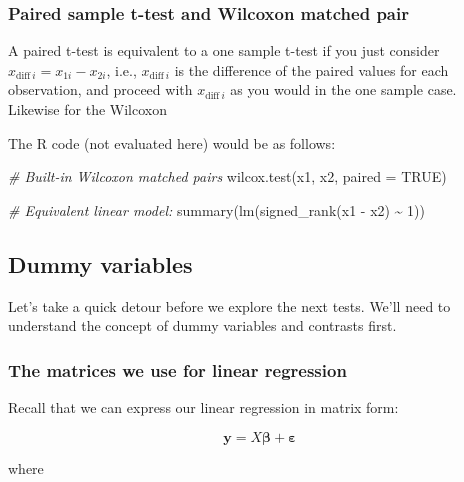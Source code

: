 \documentclass[
  openany]{book}
\newenvironment{Shaded}{\begin{snugshade}}{\end{snugshade}}
\newcommand{\AttributeTok}[1]{\textcolor[rgb]{0.77,0.63,0.00}{#1}}
\newcommand{\CommentTok}[1]{\textcolor[rgb]{0.56,0.35,0.01}{\textit{#1}}}
\newcommand{\ConstantTok}[1]{\textcolor[rgb]{0.00,0.00,0.00}{#1}}
\newcommand{\DecValTok}[1]{\textcolor[rgb]{0.00,0.00,0.81}{#1}}
\newcommand{\FunctionTok}[1]{\textcolor[rgb]{0.00,0.00,0.00}{#1}}
\newcommand{\NormalTok}[1]{#1}
\newcommand{\SpecialCharTok}[1]{\textcolor[rgb]{0.00,0.00,0.00}{#1}}
\begin{document}
\hypertarget{paired-sample-t-test-and-wilcoxon-matched-pair}{%
\subsubsection{Paired sample t-test and Wilcoxon matched pair}\label{paired-sample-t-test-and-wilcoxon-matched-pair}}

A paired t-test is equivalent to a one sample t-test if you just consider \(x_{\text{diff}\ i} = x_{1i} - x_{2i}\), i.e., \(x_{\text{diff}\ i}\) is the difference of the paired values for each observation, and proceed with \(x_{\text{diff}\ i}\) as you would in the one sample case. Likewise for the Wilcoxon

The R code (not evaluated here) would be as follows:

\begin{Shaded}
\begin{Highlighting}[]
\CommentTok{\# Built{-}in Wilcoxon matched pairs}
\FunctionTok{wilcox.test}\NormalTok{(x1, x2, }\AttributeTok{paired =} \ConstantTok{TRUE}\NormalTok{)}

\CommentTok{\# Equivalent linear model:}
\FunctionTok{summary}\NormalTok{(}\FunctionTok{lm}\NormalTok{(}\FunctionTok{signed\_rank}\NormalTok{(x1 }\SpecialCharTok{{-}}\NormalTok{ x2) }\SpecialCharTok{\textasciitilde{}} \DecValTok{1}\NormalTok{))}
\end{Highlighting}
\end{Shaded}

\hypertarget{dummy-variables}{%
\subsection{Dummy variables}\label{dummy-variables}}

Let's take a quick detour before we explore the next tests. We'll need to understand the concept of dummy variables and contrasts first.

\hypertarget{the-matrices-we-use-for-linear-regression}{%
\subsubsection{The matrices we use for linear regression}\label{the-matrices-we-use-for-linear-regression}}

Recall that we can express our linear regression in matrix form:

\[\mathbf{y} = X\boldsymbol\beta + \boldsymbol\varepsilon\]

where
\end{document}
